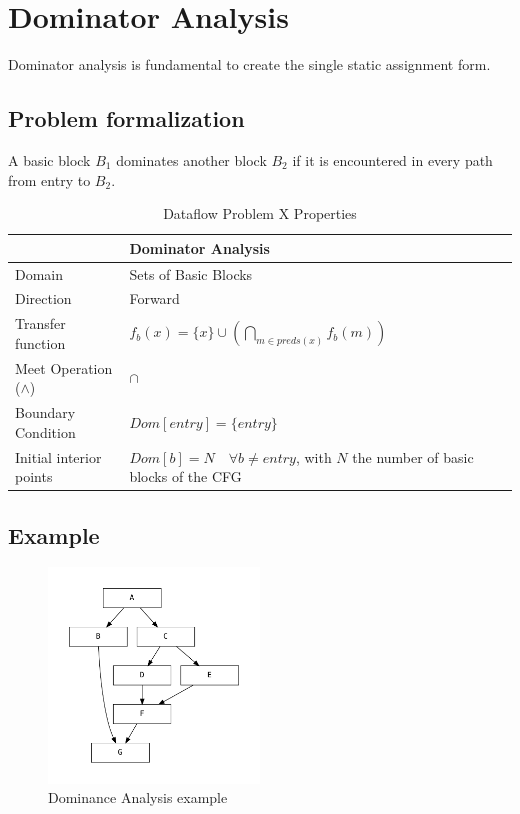 \documentclass{article}
\begin{document}
\section{Dominator Analysis}

Dominator analysis is fundamental to create the single static assignment form.

\subsection{Problem formalization}

A basic block $B_1$ dominates another block $B_2$ if it is encountered in every path from entry to $B_2$.

\begin{table}[H]
\centering
\begin{tabular}{|p{}|p{}|}
\hline
 & \textbf{Dominator Analysis} \\
\hline
Domain & Sets of Basic Blocks \\
\hline
Direction & Forward \\
\hline
Transfer function & $f_b(x) = \{x\} \cup (\bigcap_{m \in preds(x)} f_b(m)) $ \\
\hline
Meet Operation ($\wedge$) & $\cap$ \\
\hline
Boundary Condition & $Dom[entry] = \{entry\}$ \\
\hline
Initial interior points & $Dom[b] = N \quad \forall b \neq entry$, with $N$ the number of basic blocks of the CFG \\
\hline
\end{tabular}
\caption{Dataflow Problem X Properties}
\label{tab:dataflow_problem_x}
\end{table}

\subsection{Example}

\begin{figure}[H]
    \centering
    \includegraphics[width=0.5\textwidth]{graphs/dominance.pdf}
    \caption{Dominance Analysis example}
    \label{fig:enter-label}
\end{figure}
\end{document}
